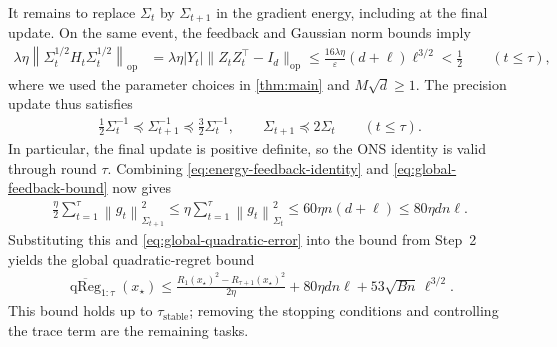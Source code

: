 \documentclass{article}
\newcommand{\op}{\mathrm{op}}
\newcommand{\1}{\mathbf 1}
\newcommand{\eps}{\varepsilon}
\newcommand{\normm}[2]{\left\lVert #1\right\rVert_{#2}}
\begin{document}
It remains to replace $\Sigma_t$ by $\Sigma_{t+1}$
in the gradient energy, including at the final update.
On the same event, the feedback and Gaussian norm bounds imply
\begin{align}
    \lambda\eta\left\|
    \Sigma_t^{1/2}H_t\Sigma_t^{1/2}
    \right\|_{\op}
     & =\lambda\eta|Y_t|\|Z_tZ_t^\top-I_d\|_{\op}
    \leq\frac{16\lambda\eta}{\eps}(d+\ell)\ell^{3/2}
    <\frac12
    \qquad(t\leq\tau),
\end{align}
where we used the parameter choices in \cref{thm:main} and $M\sqrt d\geq1$.
The precision update thus satisfies
\begin{align}
    \frac12\Sigma_t^{-1}
    \preceq\Sigma_{t+1}^{-1}
    \preceq\frac32\Sigma_t^{-1},
    \qquad
    \Sigma_{t+1}\preceq2\Sigma_t
    \qquad(t\leq\tau).
    \label{eq:global-one-step-comparison}
\end{align}
In particular, the final update is positive definite, so the ONS
identity is valid through round $\tau$.
Combining \eqref{eq:energy-feedback-identity} and
\eqref{eq:global-feedback-bound} now gives
\begin{align}
    \frac{\eta}{2}\sum_{t=1}^{\tau}
    \normm{g_t}{\Sigma_{t+1}}^2
    \leq\eta\sum_{t=1}^{\tau}
    \normm{g_t}{\Sigma_t}^2
    \leq60\eta n(d+\ell)
    \leq80\eta dn\ell.
    \label{eq:global-gradient-energy}
\end{align}
Substituting this and \eqref{eq:global-quadratic-error} into the bound
from Step~2 yields the global quadratic-regret bound
\begin{align}
    \overline{\operatorname{qReg}}_{1:\tau}(x_\star)
    \leq
    \frac{R_1(x_\star)^2-R_{\tau+1}(x_\star)^2}{2\eta}
    +80\eta dn\ell+53\sqrt{Bn}\,\ell^{3/2}.
    \label{eq:global-quadratic-regret}
\end{align}
This bound holds up to $\tau_{\mathrm{stable}}$; removing the stopping
conditions and controlling the trace term are the remaining tasks.
\end{document}
